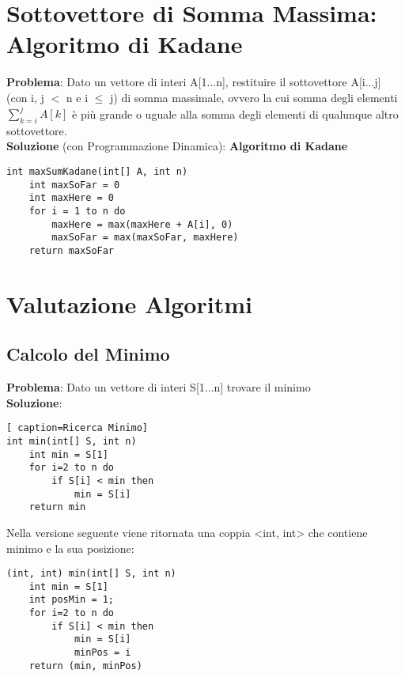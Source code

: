 \documentclass[../cheatSheetAlgoritmi.tex]{subfiles}
\begin{document}
\section{Sottovettore di Somma Massima: Algoritmo di Kadane}
\textbf{Problema}: Dato un vettore di interi A[1...n], restituire il sottovettore A[i...j] (con i, j $<$ n e i $\leq$ j) di somma massimale, ovvero la cui somma degli elementi $\sum\limits_{k=i}^j A[k]$ è più grande o uguale alla somma degli elementi di qualunque altro sottovettore.\\
\textbf{Soluzione} (con Programmazione Dinamica): \textbf{Algoritmo di Kadane}
\begin{lstlisting}[caption=Kadane Algorithm]
int maxSumKadane(int[] A, int n)
	int maxSoFar = 0
	int maxHere = 0
	for i = 1 to n do
		maxHere = max(maxHere + A[i], 0)
		maxSoFar = max(maxSoFar, maxHere)
	return maxSoFar
\end{lstlisting}

\section{Valutazione Algoritmi} \subsection{Calcolo del Minimo}
\textbf{Problema}: Dato un vettore di interi S[1...n] trovare il minimo\\
\textbf{Soluzione}:
\begin{lstlisting}[ caption=Ricerca Minimo]
int min(int[] S, int n)
	int min = S[1]
	for i=2 to n do
		if S[i] < min then
			min = S[i]
	return min
\end{lstlisting}
Nella versione seguente viene ritornata una coppia <int, int> che contiene minimo e la sua posizione:
\begin{lstlisting}[caption=Ricerca Minimo ritornando gli indici]
(int, int) min(int[] S, int n)
	int min = S[1]
	int posMin = 1;
	for i=2 to n do
		if S[i] < min then
			min = S[i]
			minPos = i
	return (min, minPos)
\end{lstlisting}
\newpage
\end{document}
